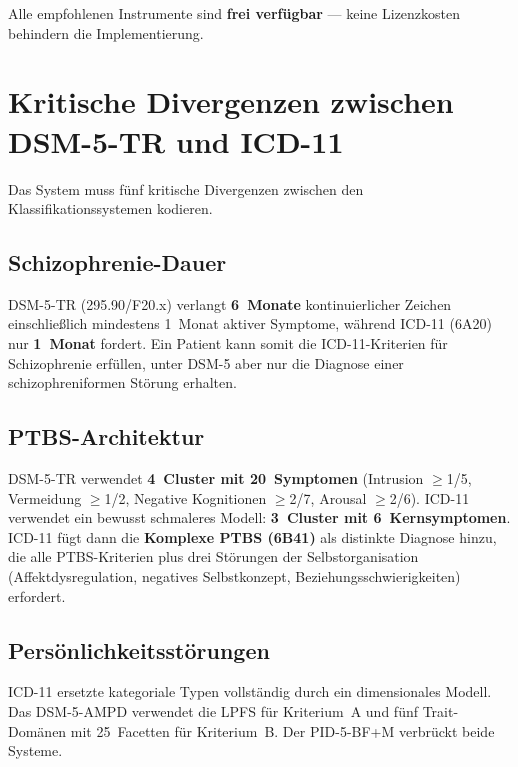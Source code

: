 \documentclass[11pt,a4paper]{article}
\begin{document}
Alle empfohlenen Instrumente sind \textbf{frei verf\"ugbar} --- keine Lizenzkosten behindern die Implementierung.


\section{Kritische Divergenzen zwischen DSM-5-TR und ICD-11}
\label{sec:divergenzen}

Das System muss f\"unf kritische Divergenzen zwischen den Klassifikationssystemen kodieren.

\subsection{Schizophrenie-Dauer}

DSM-5-TR (295.90/F20.x) verlangt \textbf{6~Monate} kontinuierlicher Zeichen einschlie\ss{}lich mindestens 1~Monat aktiver Symptome, w\"ahrend ICD-11 (6A20) nur \textbf{1~Monat} fordert. Ein Patient kann somit die ICD-11-Kriterien f\"ur Schizophrenie erf\"ullen, unter DSM-5 aber nur die Diagnose einer schizophreniformen St\"orung erhalten.

\subsection{PTBS-Architektur}

DSM-5-TR verwendet \textbf{4~Cluster mit 20~Symptomen} (Intrusion $\geq$1/5, Vermeidung $\geq$1/2, Negative Kognitionen $\geq$2/7, Arousal $\geq$2/6). ICD-11 verwendet ein bewusst schmaleres Modell: \textbf{3~Cluster mit 6~Kernsymptomen}. ICD-11 f\"ugt dann die \textbf{Komplexe PTBS (6B41)} als distinkte Diagnose hinzu, die alle PTBS-Kriterien plus drei St\"orungen der Selbstorganisation (Affektdysregulation, negatives Selbstkonzept, Beziehungsschwierigkeiten) erfordert.

\subsection{Pers\"onlichkeitsst\"orungen}

ICD-11 ersetzte kategoriale Typen vollst\"andig durch ein dimensionales Modell. Das DSM-5-AMPD verwendet die LPFS f\"ur Kriterium~A und f\"unf Trait-Dom\"anen mit 25~Facetten f\"ur Kriterium~B. Der PID-5-BF+M verbr\"uckt beide Systeme.
\end{document}
